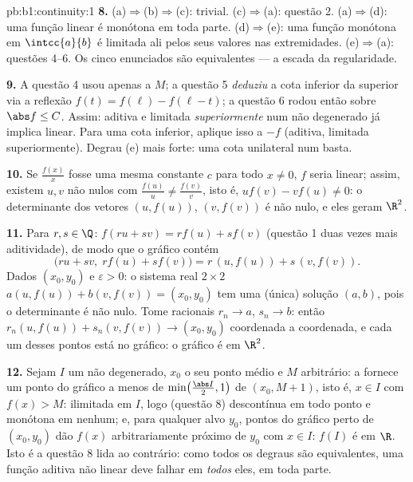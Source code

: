 \begin{solution}{pb:b1:continuity:1}
\textbf{8.} (a)$\Rightarrow$(b)$\Rightarrow$(c): trivial.
(c)$\Rightarrow$(a): questão 2. (a)$\Rightarrow$(d): uma função linear
é monótona em toda parte. (d)$\Rightarrow$(e): uma função monótona
em $\intcc{a}{b}$ é limitada ali pelos seus valores nas
extremidades. (e)$\Rightarrow$(a): questões 4--6. Os cinco
enunciados são equivalentes --- a escada da regularidade.

\textbf{9.} A questão 4 usou apenas a  $M$; a questão 5
\emph{deduziu} a cota inferior da superior via a
reflexão $f(t) = f(\ell) - f(\ell - t)$; a questão 6 rodou então sobre
$\abs f \leq C$. Assim: aditiva e limitada \emph{superiormente} num
 não degenerado já implica linear. Para uma cota
inferior, aplique isso a $-f$ (aditiva, limitada superiormente). Degrau
(e) mais forte: uma cota unilateral num  basta.

\textbf{10.} Se $\frac{f(x)}{x}$ fosse uma mesma constante $c$ para todo
$x \neq 0$, $f$ seria linear; assim, existem $u, v$ não nulos
com $\frac{f(u)}u \neq \frac{f(v)}v$, isto é, $u f(v) - v f(u)
\neq 0$: o determinante dos vetores $(u, f(u))$, $(v,
f(v))$ é não nulo, e eles geram $\R^2$.

\textbf{11.} Para $r, s \in \Q$: $f(ru + sv) = r f(u) + s f(v)$
(questão 1 duas vezes mais aditividade), de modo que o gráfico contém
\[
\bigl(ru + sv,\; r f(u) + s f(v)\bigr)
= r\,(u, f(u)) + s\,(v, f(v)) .
\]
Dados $(x_0, y_0)$ e $\varepsilon > 0$: o sistema real $2 \times 2$
$a(u, f(u)) + b(v, f(v)) = (x_0, y_0)$ tem uma (única)
solução $(a, b)$, pois o determinante é não nulo. Tome
racionais $r_n \to a$, $s_n \to b$: então $r_n(u, f(u)) +
s_n(v, f(v)) \to (x_0, y_0)$ coordenada a coordenada, e cada um desses
pontos está no gráfico: o gráfico é  em $\R^2$.

\textbf{12.} Sejam $I$ um  não degenerado, $x_0$ o seu
ponto médio e $M$ arbitrário: a  fornece um ponto do gráfico a
menos de $\min\bigl(\frac{\abs I}{2}, 1\bigr)$ de $(x_0, M + 1)$, isto é,
$x \in I$ com $f(x) > M$: ilimitada em $I$, logo (questão 8)
descontínua em todo ponto e monótona em  nenhum; e,
para qualquer alvo $y_0$, pontos do gráfico perto de $(x_0, y_0)$ dão $f(x)$
arbitrariamente próximo de $y_0$ com $x \in I$: $f(I)$ é  em
$\R$. Isto é a questão 8 lida ao contrário: como todos os degraus são
equivalentes, uma função aditiva não linear deve falhar em \emph{todos}
eles, em toda parte.


\end{solution}
